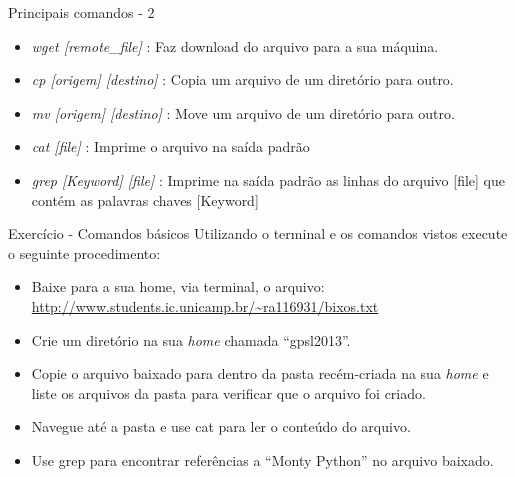 \documentclass{beamer}
\begin{document}
\begin{frame}{Principais comandos - 2}
   \begin{itemize}
   \item \emph{wget [remote\_file]} : Faz download do arquivo para a sua
     máquina.
   \item \emph{cp [origem] [destino]} : Copia um arquivo de um diretório para
     outro.
   \item \emph{mv [origem] [destino]} : Move um arquivo de um diretório para
     outro.
   \item \emph{cat [file]} : Imprime o arquivo na saída padrão
   \item \emph{grep [Keyword] [file]} : Imprime na saída padrão as linhas do
     arquivo [file] que contém as palavras chaves [Keyword]
   \end{itemize}
\end{frame}


\begin{frame}{Exercício - Comandos básicos}
  Utilizando o terminal e os comandos vistos execute o seguinte procedimento:
  \begin{itemize}
  \item Baixe para a sua home, via terminal, o arquivo:
    \url{http://www.students.ic.unicamp.br/\~ra116931/bixos.txt}
  \item Crie um diretório na sua \emph{home} chamada ``gpsl2013''.
  \item Copie o arquivo baixado para dentro da pasta recém-criada na sua
    \emph{home} e liste os arquivos da pasta para verificar que o arquivo foi
    criado.
  \item Navegue até a pasta e use cat para ler o conteúdo do arquivo.
  \item Use grep para encontrar referências a ``Monty Python'' no arquivo
    baixado.
  \end{itemize}
\end{frame}
\end{document}
